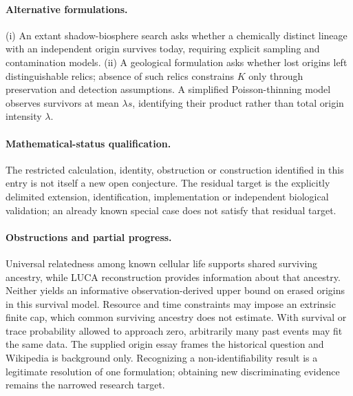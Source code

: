 \documentclass[11pt]{article}
\begin{document}
\paragraph{Alternative formulations.} (i) An extant shadow-biosphere search asks whether a chemically distinct lineage with an independent origin survives today, requiring explicit sampling and contamination models. (ii) A geological formulation asks whether lost origins left distinguishable relics; absence of such relics constrains $K$ only through preservation and detection assumptions. A simplified Poisson-thinning model observes survivors at mean $\lambda s$, identifying their product rather than total origin intensity $\lambda$.

\paragraph{Mathematical-status qualification.} The restricted calculation, identity, obstruction or construction identified in this entry is not itself a new open conjecture. The residual target is the explicitly delimited extension, identification, implementation or independent biological validation; an already known special case does not satisfy that residual target.

\paragraph{Obstructions and partial progress.} Universal relatedness among known cellular life supports shared surviving ancestry, while LUCA reconstruction provides information about that ancestry. Neither yields an informative observation-derived upper bound on erased origins in this survival model. Resource and time constraints may impose an extrinsic finite cap, which common surviving ancestry does not estimate. With survival or trace probability allowed to approach zero, arbitrarily many past events may fit the same data. The supplied origin essay frames the historical question and Wikipedia is background only. Recognizing a non-identifiability result is a legitimate resolution of one formulation; obtaining new discriminating evidence remains the narrowed research target.
\end{document}
